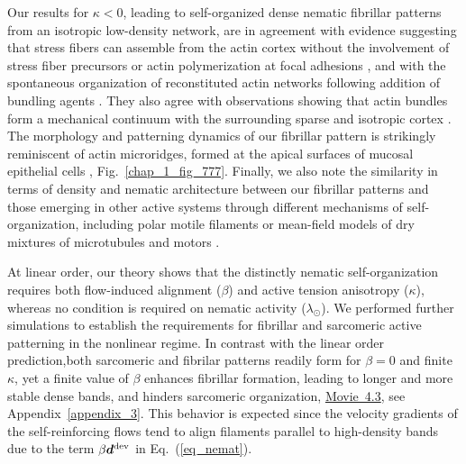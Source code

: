 Our results for $\kappa<0$, leading to self-organized dense nematic fibrillar patterns from an isotropic low-density network, are in agreement with evidence suggesting that stress fibers can assemble from the actin cortex without the involvement of stress fiber precursors or actin polymerization at focal adhesions \cite{lehtimaki2021}, and with the spontaneous organization of reconstituted actin networks following addition of bundling agents \cite{deshpande2015}. They also agree with observations showing that actin bundles form a mechanical continuum with the surrounding sparse and isotropic cortex \cite{vignaud2021}. The morphology and patterning dynamics of our fibrillar pattern is strikingly reminiscent of actin microridges, formed at the apical surfaces of 
mucosal epithelial cells \cite{https://doi.org/10.1002/ar.23965,10.1083/jcb.201904144}, Fig.~\ref{chap_1_fig_777}. Finally, we also note the similarity in terms of density and nematic architecture between our fibrillar patterns and those emerging in other active systems through different mechanisms of self-organization, including polar motile filaments \cite{doi:10.1126/science.aao5434,Denk:2020vm} or mean-field models of dry mixtures of microtubules and motors \cite{C9SM00558G}. 

\medskip
{} At linear order, our theory shows that the distinctly nematic self-organization requires both flow-induced alignment ($\beta$) and active tension anisotropy ($\kappa$), whereas no condition is required on nematic activity ($\lambda_\odot$). We performed further simulations to establish the requirements for fibrillar and sarcomeric active patterning in the nonlinear regime. In contrast with the linear order prediction,both  sarcomeric and fibrilar patterns readily form for $\beta=0$ and finite $\kappa$, yet a finite value of $\beta$ enhances fibrillar formation, leading to longer and more stable dense bands, and hinders sarcomeric organization, \href{https://github.com/waleedmirzaPhD/movies_thesis.git}{Movie~4.3}, see Appendix~\ref{appendix_3}. This behavior is expected since the velocity gradients of the self-reinforcing flows tend to align filaments parallel to high-density bands due to the term $\beta \bm{d}^{\rm dev}$ in Eq.~(\ref{eq_nemat}). 

